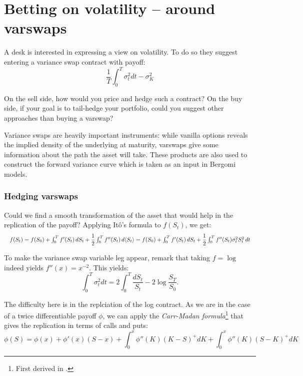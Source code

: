 \section{Betting on volatility -- around varswaps}

\begin{tcolorbox}[width=\linewidth, sharp corners=all, colback=white!95!black]
    A desk is interested in expressing a view on volatility. To do so they suggest entering a variance swap contract with payoff:
    \[\dfrac{1}{T} \int_{0}^{T} \sigma_t^2 dt - \sigma_K^2\]

    On the sell side, how would you price and hedge such a contract?\newline
    On the buy side, if your goal is to tail-hedge your portfolio, could you suggest other approaches than buying a varswap?

\end{tcolorbox}

Variance swaps are heavily important instruments: while vanilla options reveals the implied density of the underlying at maturity, varswaps give some information about the path the asset will take. These products are also used to construct the forward variance curve which is taken as an input in Bergomi models.

\subsubsection*{Hedging varswaps}
Could we find a smooth transformation of the asset that would help in the replication of the payoff? Applying Itô's formula to $f(S_t)$, we get:
\begin{equation*}
        \resizebox{\hsize}{!}{$ f(S_t) = f(S_0) + \int_0^T f'(S_t) \,dS_t + \dfrac{1}{2} \int_0^T f''(S_t) \,d\langle S_t\rangle = f(S_0) + \int_0^T f'(S_t) \,dS_t + \dfrac{1}{2} \int_0^T f''(S_t) \sigma_t^2 S_t^2 \,dt $}
\end{equation*}


To make the variance swap variable leg appear, remark that taking $f = \log$ indeed yields $f''(x) = x^{-2}$.
This yields:
\[
    \int_{0}^{T} \sigma_t^2 dt = 2 \int_0^T \dfrac{dS_t}{S_t} - 2 \log \dfrac{S_T}{S_0}.
\]

The difficulty here is in the replciation of the log contract. As we are in the case of a twice differentiable payoff $\phi$, we can apply the \textit{Carr-Madan formula}\footnote{First derived in .} that gives the replication in terms of calls and puts:
\begin{equation}\label{eqn:carr-madan}
    \phi(S) = \phi(x) + \phi'(x)(S-x) + \int_0^x \phi''(K)(K-S)^{+} dK + \int_0^x \phi''(K)(S-K)^{+} dK
\end{equation}


